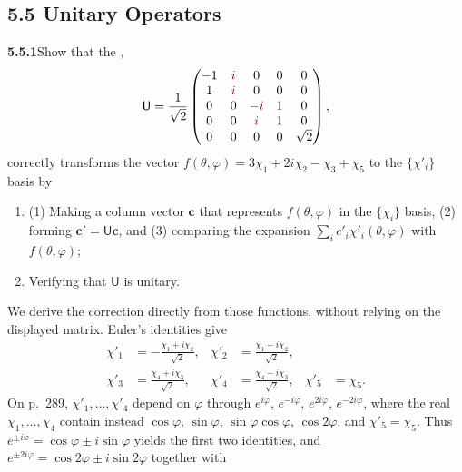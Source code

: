 \subsection*{5.5 Unitary Operators}

\par\bigskip
\noindent\textbf{5.5.1}\quad Show that the ,
\[
\mathsf U=\frac1{\sqrt2}\begin{pmatrix}
-1&\erratum{i}&0&0&0\\1&\erratum{i}&0&0&0\\
0&0&\erratum{-i}&1&0\\0&0&\erratum{i}&1&0\\
0&0&0&0&\sqrt2
\end{pmatrix},
\]
correctly transforms the vector
$f(\theta,\varphi)=3\chi_{1}+2i\chi_{2}-\chi_{3}+\chi_{5}$ to the
$\{\chi'_{i}\}$ basis by
\begin{enumerate}
\item[(a)] (1) Making a column vector $\mathbf{c}$ that represents
  $f(\theta,\varphi)$ in the $\{\chi_{i}\}$ basis, (2) forming
  $\mathbf{c}'=\mathsf{U}\mathbf{c}$, and (3) comparing the expansion
  $\sum_{i}c'_{i}\chi'_{i}(\theta,\varphi)$ with $f(\theta,\varphi)$;
\item[(b)] Verifying that $\mathsf{U}$ is unitary.
\end{enumerate}
\solution
{}
We derive the correction directly from those functions, without relying
on the displayed matrix. Euler's identities give
\begin{align*}
\chi'_1&=-\frac{\chi_1+i\chi_2}{\sqrt2},&
\chi'_2&=\frac{\chi_1-i\chi_2}{\sqrt2},\\
\chi'_3&=\frac{\chi_4+i\chi_3}{\sqrt2},&
\chi'_4&=\frac{\chi_4-i\chi_3}{\sqrt2},&
\chi'_5&=\chi_5.
\end{align*}
On p.~289, $\chi'_1,\dots,\chi'_4$ depend on $\varphi$ through
$e^{i\varphi}$, $e^{-i\varphi}$, $e^{2i\varphi}$, $e^{-2i\varphi}$, where
the real $\chi_1,\dots,\chi_4$ contain instead $\cos\varphi$,
$\sin\varphi$, $\sin\varphi\cos\varphi$, $\cos2\varphi$, and
$\chi'_5=\chi_5$. Thus $e^{\pm i\varphi}=\cos\varphi\pm i\sin\varphi$
yields the first two identities, and
$e^{\pm2i\varphi}=\cos2\varphi\pm i\sin2\varphi$ together with

